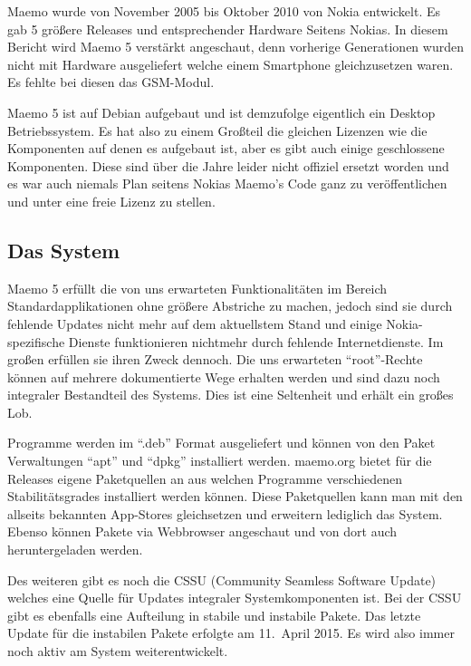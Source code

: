 Maemo wurde von November 2005\cite{online:maemo1-770} bis Oktober 2010\cite{online:maemo5-n900} von Nokia  entwickelt. Es gab 5 größere Releases und entsprechender Hardware Seitens Nokias\cite{online:maemo1-770}\cite{online:n800-specs}\cite{online:n810-specs}\cite{online:n900-specs}. In diesem Bericht wird Maemo 5 verstärkt angeschaut, denn vorherige Generationen wurden nicht mit Hardware ausgeliefert welche einem Smartphone gleichzusetzen waren. Es fehlte bei diesen das GSM-Modul.

Maemo 5 ist auf Debian aufgebaut\cite{online:maemo-about} und ist demzufolge eigentlich ein Desktop Betriebssystem. Es hat also zu einem Großteil die gleichen Lizenzen wie die Komponenten auf denen es aufgebaut ist, aber es gibt auch einige geschlossene Komponenten\cite{online:maemo5-components}. Diese sind über die Jahre leider nicht offiziel ersetzt worden und es war auch niemals Plan seitens Nokias Maemo's Code ganz zu veröffentlichen und unter eine freie Lizenz zu stellen\cite{online:maemo-slides}.\\

\subsection{Das System}
Maemo 5 erfüllt die von uns erwarteten Funktionalitäten im Bereich Standardapplikationen ohne größere Abstriche zu machen, jedoch sind sie durch fehlende Updates nicht mehr auf dem aktuellstem Stand und einige Nokia-spezifische Dienste funktionieren nichtmehr durch fehlende Internetdienste. Im großen erfüllen sie ihren Zweck dennoch. Die uns erwarteten ``root''-Rechte können auf mehrere dokumentierte Wege erhalten werden und sind dazu noch integraler Bestandteil des Systems\cite{online:maemo-root}. Dies ist eine Seltenheit und erhält ein großes Lob.

Programme werden im ``.deb'' Format ausgeliefert und können von den Paket Verwaltungen ``apt'' und ``dpkg'' installiert werden\cite{online:maemo-packetinstalling}.
\mbox{maemo.org} bietet für die Releases eigene Paketquellen an aus welchen Programme verschiedenen Stabilitätsgrades installiert werden können\cite{online:maemo-extras}. Diese Paketquellen kann man mit den allseits bekannten App-Stores gleichsetzen und erweitern lediglich das System. Ebenso können Pakete via Webbrowser angeschaut und von dort auch heruntergeladen  werden\cite{online:maemo-store}\cite{online:maemo-rawrepos}.

Des weiteren gibt es noch die CSSU\cite{online:maemo-cssu} (Community Seamless Software Update) welches eine Quelle für Updates integraler Systemkomponenten ist. Bei der CSSU gibt es ebenfalls eine Aufteilung in stabile und instabile Pakete. Das letzte Update für die instabilen Pakete erfolgte am 11.\ April 2015\cite{online:maemo-cssuchangelog}. Es wird also immer noch aktiv am System weiterentwickelt.

